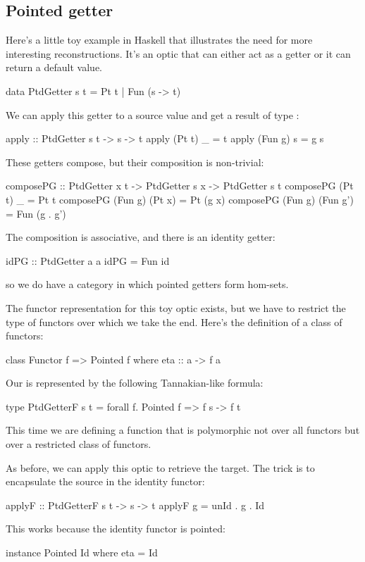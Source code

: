 \documentclass[DaoFP]{subfiles}
\begin{document}
\subsection{Pointed getter}

Here's a little toy example in Haskell that illustrates the need for more interesting reconstructions. It's an optic that can either act as a getter or it can return a default value.
\begin{haskell}
data PtdGetter s t = Pt t | Fun (s -> t)
\end{haskell}
We can apply this getter to a source value and get a result of type :
\begin{haskell}
apply :: PtdGetter s t -> s -> t
apply (Pt t) _ = t
apply (Fun g) s = g s
\end{haskell}

These getters compose, but their composition is non-trivial:
\begin{haskell}
composePG :: PtdGetter x t -> PtdGetter s x -> PtdGetter s t
composePG (Pt t) _ = Pt t
composePG (Fun g) (Pt x) = Pt (g x)
composePG (Fun g) (Fun g') = Fun (g . g')
\end{haskell}
The composition is associative, and there is an identity getter:
\begin{haskell}
idPG :: PtdGetter a a
idPG = Fun id
\end{haskell}
so we do have a category in which pointed getters form hom-sets. 

The functor representation for this toy optic exists, but we have to restrict the type of functors over which we take the end. Here's the definition of a class of  functors:
\begin{haskell}
class Functor f => Pointed f where
  eta :: a -> f a
\end{haskell}
Our  is represented by the following Tannakian-like formula:
\begin{haskell}
type PtdGetterF s t = forall f. Pointed f => f s -> f t
\end{haskell}
This time we are defining a function that is polymorphic not over all functors but over a restricted class of  functors.

As before, we can apply this optic to retrieve the target. The trick is to encapsulate the source in the identity functor:
\begin{haskell}
applyF :: PtdGetterF s t -> s -> t
applyF g = unId . g . Id
\end{haskell}
This works because the identity functor is pointed:
\begin{haskell}
instance Pointed Id where
  eta = Id
\end{haskell}
\end{document}
